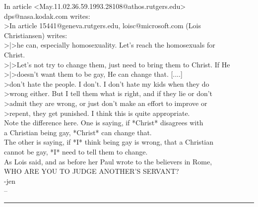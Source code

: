     In article <May.11.02.36.59.1993.28108@athos.rutgers.edu>\\ dps@nasa.kodak.com writes:\\
    >In article 15441@geneva.rutgers.edu, loisc@microsoft.com (Lois\\ Christiansen) writes:\\
    
    >|>he can, especially homosexuality.  Let's reach the homosexuals for\\ Christ.\\
    >|>Let's not try to change them, just need to bring them to Christ.  If He\\
    >|>doesn't want them to be gay, He can change that.  [....]\\
    
    >don't hate the people.  I don't.  I don't hate my kids when they do\\
    >wrong either.  But I tell them what is right, and if they lie or don't\\
    >admit they are wrong, or just don't make an effort to improve or\\
    >repent, they get punished.  I think this is quite appropriate.\\
    
    Note the difference here. One is saying, if *Christ* disagrees with\\
    a Christian being gay, *Christ* can change that.\\
    
    The other is saying, if *I* think being gay is wrong, that a Christian\\
    cannot be gay, *I* need to tell them to change.\\
    
    
    As Lois said, and as before her Paul wrote to the believers in Rome,\\
    WHO ARE YOU TO JUDGE ANOTHER'S SERVANT?\\
    
    -jen\\
    
    --
\cite{Newsgroups20}\\
\noindent\rule[0.5ex]{\linewidth}{1pt}

